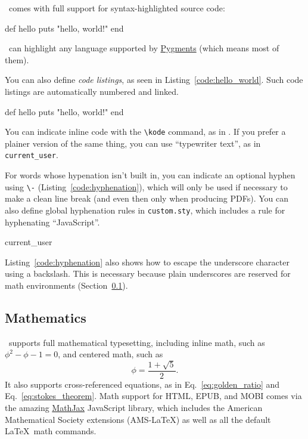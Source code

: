 \PolyTeXnic\ comes with full support for syntax-highlighted source code:
\begin{code}
def hello
  puts "hello, world!"
end
\end{code}
\noindent \PolyTeXnic\ can highlight any language supported by \href{http://pygments.org/languages/}{Pygments} (which means most of them).

You can also define \emph{code listings}, as seen in Listing~\ref{code:hello_world}. Such code listings are automatically numbered and linked.

\begin{codelisting}
\label{code:hello_world}
\begin{code}
def hello
  puts "hello, world!"
end
\end{code}
\end{codelisting}

You can indicate inline code with the \verb+\kode+ command, as in . If you prefer a plainer version of the same thing, you can use ``typewriter text'', as in \texttt{current\_\-user}.

For words whose hypenation isn't built in, you can indicate an optional hyphen using \verb+\-+ (Listing~\ref{code:hyphenation}), which will only be used if necessary to make a clean line break (and even then only when producing PDFs). You can also define global hyphenation rules in \texttt{custom.sty}, which includes a rule for hyphenating ``JavaScript''.

\begin{codelisting}
\label{code:hyphenation}
\begin{code}
current\_\-user
\end{code}
\end{codelisting}

Listing~\ref{code:hyphenation} also shows how to escape the underscore character using a backslash. This is necessary because plain underscores are reserved for math environments (Section~\ref{sec:mathematics}).

\subsection{Mathematics}
\label{sec:mathematics}

\PolyTeXnic\ supports full mathematical typesetting, including inline math, such as $\phi^2 - \phi - 1 = 0$, and centered math, such as
\[ \phi = \frac{1+\sqrt{5}}{2}. \]
It also supports cross-referenced equations, as in Eq.~\eqref{eq:golden_ratio} and Eq.~\eqref{eq:stokes_theorem}. Math support for HTML, EPUB, and MOBI comes via the amazing \href{http://www.mathjax.org/}{MathJax} JavaScript library, which includes the American Mathematical Society extensions (AMS-\LaTeX) as well as all the default \LaTeX\ math commands.

